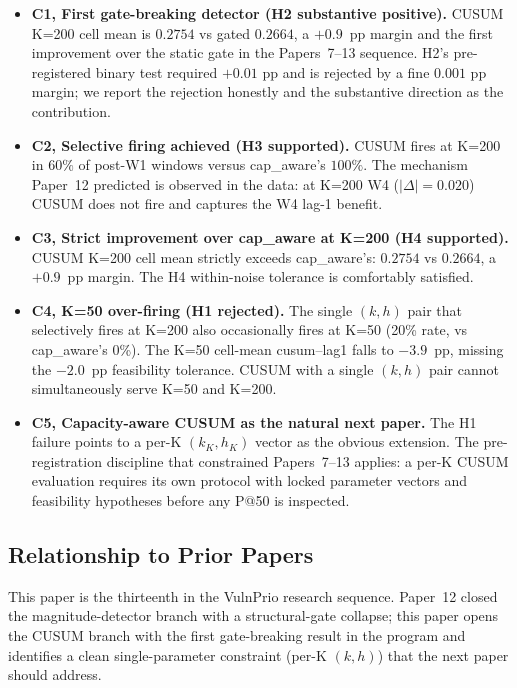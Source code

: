 \begin{itemize}
\item \textbf{C1, First gate-breaking detector (H2 substantive
positive).} CUSUM K=200 cell mean is $0.2754$ vs gated $0.2664$, a
$+0.9$~pp margin and the first improvement over the static gate in
the Papers~7--13 sequence. H2's pre-registered binary test required
$+0.01$ pp and is rejected by a fine $0.001$ pp margin; we report
the rejection honestly and the substantive direction as the
contribution.

\item \textbf{C2, Selective firing achieved (H3 supported).}
CUSUM fires at K=200 in $60\%$ of post-W1 windows versus
cap\_aware's $100\%$. The mechanism Paper~12 predicted is observed
in the data: at K=200 W4 ($|\Delta| = 0.020$) CUSUM does not fire
and captures the W4 lag-1 benefit.

\item \textbf{C3, Strict improvement over cap\_aware at K=200
(H4 supported).} CUSUM K=200 cell mean strictly exceeds
cap\_aware's: $0.2754$ vs $0.2664$, a $+0.9$~pp margin. The H4
within-noise tolerance is comfortably satisfied.

\item \textbf{C4, K=50 over-firing (H1 rejected).} The single
$(k, h)$ pair that selectively fires at K=200 also occasionally
fires at K=50 (20\% rate, vs cap\_aware's 0\%). The K=50 cell-mean
cusum--lag1 falls to $-3.9$~pp, missing the $-2.0$~pp feasibility
tolerance. CUSUM with a single $(k, h)$ pair cannot simultaneously
serve K=50 and K=200.

\item \textbf{C5, Capacity-aware CUSUM as the natural next paper.}
The H1 failure points to a per-K $(k_K, h_K)$ vector as the obvious
extension. The pre-registration discipline that constrained
Papers~7--13 applies: a per-K CUSUM evaluation requires its own
protocol with locked parameter vectors and feasibility hypotheses
before any P@50 is inspected.
\end{itemize}

\subsection{Relationship to Prior Papers}

This paper is the thirteenth in the VulnPrio research sequence.
Paper~12 closed the magnitude-detector branch with a structural-gate
collapse; this paper opens the CUSUM branch with the first
gate-breaking result in the program and identifies a clean
single-parameter constraint (per-K $(k, h)$) that the next paper
should address.
